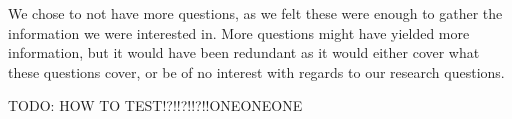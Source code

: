 We chose to not have more questions, as we felt these were enough to gather the information we were interested in. More questions might have yielded more information, but it would have been redundant as it would either cover what these questions cover, or be of no interest with regards to our research questions.

TODO: HOW TO TEST!?!!?!!?!!ONEONEONE